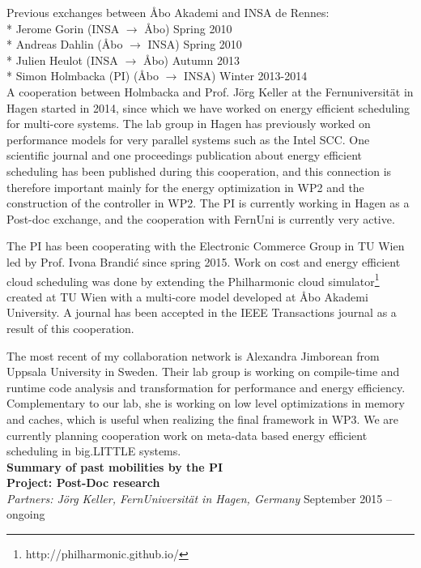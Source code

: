 \documentclass{article}
\begin{document}
Previous exchanges between \AA{}bo Akademi and INSA de Rennes:\\
* Jerome Gorin (INSA $\longrightarrow$ \AA{}bo) Spring 2010\\
* Andreas Dahlin (\AA{}bo $\longrightarrow$ INSA) Spring 2010\\
* Julien Heulot (INSA $\longrightarrow$ \AA{}bo) Autumn 2013\\
* Simon Holmbacka (PI) (\AA{}bo $\longrightarrow$ INSA) Winter 2013-2014\\

A cooperation between Holmbacka and Prof. J\"{o}rg Keller at the Fernuniversit\"{a}t in Hagen started in 2014, since which we have worked on energy efficient scheduling for multi-core systems. 
The lab group in Hagen has previously worked on performance models for very parallel systems such as the Intel SCC.
One scientific journal and one proceedings publication about energy efficient scheduling has been published during this cooperation,
and this connection is therefore important mainly for the energy optimization in WP2 and the construction of the controller in WP2.
The PI is currently working in Hagen as a Post-doc exchange, and the cooperation with FernUni is currently very active.

The PI has been cooperating with the Electronic Commerce Group in TU Wien led by Prof. Ivona Brandi\'{c} since spring 2015. 
Work on cost and energy efficient cloud scheduling was done by extending the Philharmonic cloud simulator\footnote{http://philharmonic.github.io/} created at TU Wien with a multi-core model developed at \AA{}bo Akademi University. 
A journal has been accepted in the IEEE Transactions journal as a result of this cooperation.

The most recent of my collaboration network is Alexandra Jimborean from Uppsala University in Sweden.
Their lab group is working on compile-time and runtime code analysis and transformation for performance and energy efficiency.
Complementary to our lab, she is working on low level optimizations in memory and caches, which is useful when realizing the final framework in WP3.
We are currently planning cooperation work on meta-data based energy efficient scheduling in big.LITTLE systems.\\

\textbf{Summary of past mobilities by the PI}\\

\textbf{Project: Post-Doc research}\\
\textsl{Partners: J\"{o}rg Keller, FernUniversit\"{a}t in Hagen, Germany}
\hfill September 2015 -- ongoing
\end{document}
